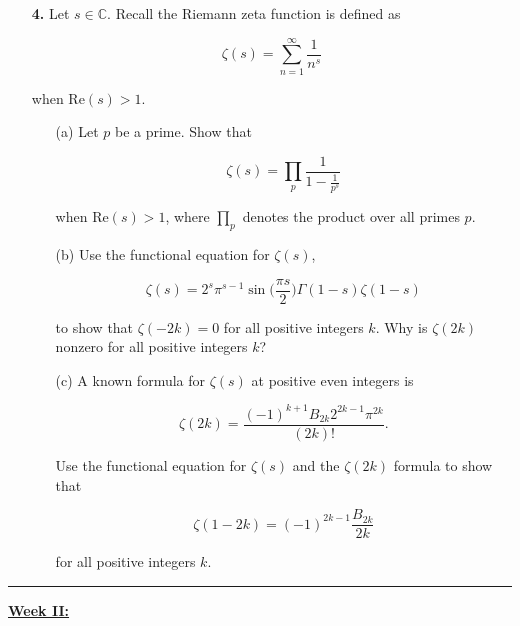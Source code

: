 \documentclass[12pt]{amsart}
\theoremstyle{definition}
\theoremstyle{remark}
\numberwithin{equation}{section}
\def\C{\mathbb C}
\def\C{\mathbb{C}}
\begin{document}
\begin{itemize}
\item[\textbf{4.}] Let $s \in \C$. Recall the Riemann zeta function is defined as 

$$\zeta(s) = \sum_{n=1}^{\infty} \frac{1}{n^s}$$

when $\text{Re}(s) > 1$.

\vspace{4mm}

\begin{itemize}
    \item[(a)] Let $p$ be a prime. Show that 

    $$\zeta(s) = \prod_{p} \frac{1}{1 - \frac{1}{p^s}} $$

    when $\text{Re}(s) > 1$, where $\displaystyle \prod_{p}$ denotes the product over all primes $p$.

\vspace{4mm}

   \item[(b)] Use the functional equation for $\zeta(s)$,

   $$\zeta(s) = 2^{s}\pi^{s-1} \sin \bigg(\frac{\pi s}{2}\bigg) \Gamma(1-s)\zeta(1-s)$$

   to show that $\zeta(-2k) = 0$ for all positive integers $k$. Why is $\zeta(2k)$ nonzero for all positive integers $k$?

\vspace{4mm}

   \item[(c)] A known formula for $\zeta(s)$ at positive even integers is

   $$\zeta(2k) = \frac{(-1)^{k+1}B_{2k}2^{2k-1}\pi^{2k}}{(2k)!}.$$

   \vspace{4mm}

   Use the functional equation for $\zeta(s)$ and the $\zeta(2k)$ formula to show that

   $$\zeta(1-2k) = (-1)^{2k-1} \frac{B_{2k}}{2k}$$

   for all positive integers $k$.
\end{itemize}

\end{itemize}

\vspace{8mm}

\hrule{}

\vspace{8mm}

\begin{center}
\large\textbf{\underline{Week II:}}
\end{center}
\end{document}
